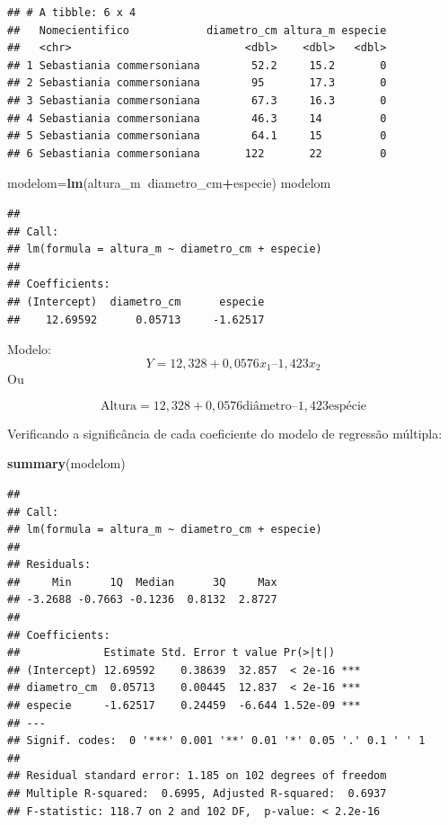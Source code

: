 \documentclass[12pt,brazil,]{book}
\newenvironment{Shaded}{\begin{snugshade}}{\end{snugshade}}
\newcommand{\KeywordTok}[1]{\textcolor[rgb]{0.13,0.29,0.53}{\textbf{#1}}}
\newcommand{\NormalTok}[1]{#1}
\newcommand{\OperatorTok}[1]{\textcolor[rgb]{0.81,0.36,0.00}{\textbf{#1}}}
\begin{document}
\begin{verbatim}
## # A tibble: 6 x 4
##   Nomecientifico            diametro_cm altura_m especie
##   <chr>                           <dbl>    <dbl>   <dbl>
## 1 Sebastiania commersoniana        52.2     15.2       0
## 2 Sebastiania commersoniana        95       17.3       0
## 3 Sebastiania commersoniana        67.3     16.3       0
## 4 Sebastiania commersoniana        46.3     14         0
## 5 Sebastiania commersoniana        64.1     15         0
## 6 Sebastiania commersoniana       122       22         0
\end{verbatim}

\begin{Shaded}
\begin{Highlighting}[]
\NormalTok{modelom=}\KeywordTok{lm}\NormalTok{(altura_m}\OperatorTok{~}\NormalTok{diametro_cm}\OperatorTok{+}\NormalTok{especie) }
\NormalTok{modelom}
\end{Highlighting}
\end{Shaded}

\begin{verbatim}
## 
## Call:
## lm(formula = altura_m ~ diametro_cm + especie)
## 
## Coefficients:
## (Intercept)  diametro_cm      especie  
##    12.69592      0.05713     -1.62517
\end{verbatim}

Modelo: \[
Y = 12,328 + 0,0576 x_1 – 1,423 x_2
\] Ou

\[
\text{Altura} = 12,328 + 0,0576\text{diâmetro} – 1,423\text{espécie}
\]

Verificando a significância de cada coeficiente do modelo de regressão
múltipla:

\begin{Shaded}
\begin{Highlighting}[]
\KeywordTok{summary}\NormalTok{(modelom)}
\end{Highlighting}
\end{Shaded}

\begin{verbatim}
## 
## Call:
## lm(formula = altura_m ~ diametro_cm + especie)
## 
## Residuals:
##     Min      1Q  Median      3Q     Max 
## -3.2688 -0.7663 -0.1236  0.8132  2.8727 
## 
## Coefficients:
##             Estimate Std. Error t value Pr(>|t|)    
## (Intercept) 12.69592    0.38639  32.857  < 2e-16 ***
## diametro_cm  0.05713    0.00445  12.837  < 2e-16 ***
## especie     -1.62517    0.24459  -6.644 1.52e-09 ***
## ---
## Signif. codes:  0 '***' 0.001 '**' 0.01 '*' 0.05 '.' 0.1 ' ' 1
## 
## Residual standard error: 1.185 on 102 degrees of freedom
## Multiple R-squared:  0.6995, Adjusted R-squared:  0.6937 
## F-statistic: 118.7 on 2 and 102 DF,  p-value: < 2.2e-16
\end{verbatim}
\end{document}
